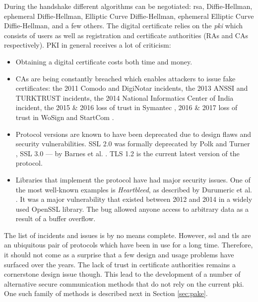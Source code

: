 During the handshake different algorithms can be negotiated: \gls{rsa}, Diffie-Hellman, ephemeral Diffie-Hellman, Elliptic Curve Diffie-Hellman, ephemeral Elliptic Cur\-ve Diffie-Hellman, and a few others. The digital certificate relies on the \emph{\gls{pki}} which consists of users as well as registration and certificate authorities (RAs and CAs respectively). PKI in general receives a lot of criticism:

\begin{itemize}
    \item Obtaining a digital certificate costs both time and money.
    \item CAs are being constantly breached which enables attackers to issue fake certificates: the 2011 Comodo \cite{comodo:2017:ca-incident} and DigiNotar \cite{diginotar:2017:ca-incident} incidents, the 2013 ANSSI \cite{anssi:2017:ca-incident} and TURKTRUST \cite{turktrust:2017:ca-incident-0} incidents, the 2014 National Informatics Center of India \cite{nic:2017:ca-incident} incident, the 2015 \& 2016 loss of trust in Symantec \cite{symantec:2017:ca-incident-0, symantec:2017:ca-incident-1}, 2016 \& 2017 loss of trust in WoSign and StartCom \cite{startcom:2017:ca-incident-0, startcom:2017:ca-incident-1}.
    \item Protocol versions are known to have been deprecated due to design flaws and security vulnerabilities. SSL 2.0 was formally deprecated by Polk and Turner \cite{rfc6176}, SSL 3.0  --- by Barnes et al. \cite{rfc7568}. TLS 1.2 is the current latest version of the protocol.
    \item Libraries that implement the protocol have had major security issues. One of the most well-known examples is \emph{Heartbleed}, as described by Durumeric et al. \cite{durumeric2014matter}. It was a major vulnerability that existed between 2012 and 2014 in a widely used OpenSSL library. The bug allowed anyone access to arbitrary data as a result of a buffer overflow.
  \end{itemize}

The list of incidents and issues is by no means complete. However, \gls{ssl} and \gls{tls} are an ubiquitous pair of protocols which have been in use for a long time. Therefore, it should not come as a surprise that a few design and usage problems have surfaced over the years. The lack of trust in certificate authorities remains a cornerstone design issue though. This lead to the development of a number of alternative secure communication methods that do not rely on the current \gls{pki}. One such family of methods is described next in Section \ref{sec:pake}.

